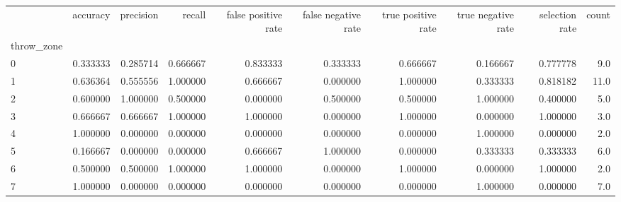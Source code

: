 \begin{tabular}{lrrrrrrrrr}
\toprule
{} &  accuracy &  precision &    recall &  false positive rate &  false negative rate &  true positive rate &  true negative rate &  selection rate &  count \\
throw\_zone &           &            &           &                      &                      &                     &                     &                 &        \\
\midrule
0          &  0.333333 &   0.285714 &  0.666667 &             0.833333 &             0.333333 &            0.666667 &            0.166667 &        0.777778 &    9.0 \\
1          &  0.636364 &   0.555556 &  1.000000 &             0.666667 &             0.000000 &            1.000000 &            0.333333 &        0.818182 &   11.0 \\
2          &  0.600000 &   1.000000 &  0.500000 &             0.000000 &             0.500000 &            0.500000 &            1.000000 &        0.400000 &    5.0 \\
3          &  0.666667 &   0.666667 &  1.000000 &             1.000000 &             0.000000 &            1.000000 &            0.000000 &        1.000000 &    3.0 \\
4          &  1.000000 &   0.000000 &  0.000000 &             0.000000 &             0.000000 &            0.000000 &            1.000000 &        0.000000 &    2.0 \\
5          &  0.166667 &   0.000000 &  0.000000 &             0.666667 &             1.000000 &            0.000000 &            0.333333 &        0.333333 &    6.0 \\
6          &  0.500000 &   0.500000 &  1.000000 &             1.000000 &             0.000000 &            1.000000 &            0.000000 &        1.000000 &    2.0 \\
7          &  1.000000 &   0.000000 &  0.000000 &             0.000000 &             0.000000 &            0.000000 &            1.000000 &        0.000000 &    7.0 \\
\bottomrule
\end{tabular}

